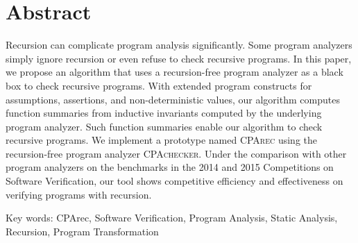 
\chapter{Abstract}

Recursion can complicate program analysis significantly.
Some program analyzers simply ignore recursion or even refuse to check recursive
programs.
In this paper, we propose an algorithm that uses a recursion-free program
analyzer as a black box to check recursive programs.
With extended program constructs for assumptions, assertions, and
non-deterministic values,
our algorithm computes function summaries from inductive invariants computed by
the underlying program analyzer.
Such function summaries enable our algorithm to check recursive programs.
We implement a prototype named \textsc{CPArec} using the recursion-free program
analyzer \textsc{CPAchecker}.
Under the comparison with other program analyzers on the benchmarks in the 2014
and 2015 Competitions on Software Verification,
our tool shows competitive efficiency and effectiveness on verifying programs
with recursion.

Key words: CPArec, Software Verification, Program Analysis, Static Analysis,
Recursion, Program Transformation
